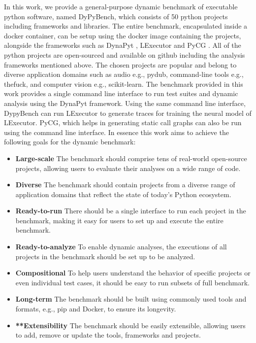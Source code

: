 In this work, we provide a general-purpose dynamic benchmark of executable python software, named DyPyBench, which consists of 50 python projects including frameworks and libraries. The entire benchmark, encapsulated inside a docker container, can be setup using the docker image containing the projects, alongside the frameworks such as DynaPyt \cite{DynaPyt2022}, LExecutor \cite{LExecutor_2023} and PyCG \cite{PyCG_2021}. All of the python projects are open-sourced and available on github \cite{github} including the analysis frameworks mentioned above. The chosen projects are popular and belong to diverse application domains such as audio e.g., pydub, command-line tools e.g., thefuck, and computer vision e.g., scikit-learn. The benchmark provided in this work provides a single command line interface to run test suites and dynamic analysis using the DynaPyt framework. Using the same command line interface, DypyBench can run LExecutor to generate traces for training the neural model of LExecutor. PyCG, which helps in generating static call graphs can also be run using the command line interface. In essence this work aims to achieve the following goals for the dynamic benchmark:
\begin{itemize}
    \item \textbf{Large-scale} The benchmark should comprise tens of real-world open-source projects, allowing users to evaluate their analyses on a wide range of code.
    \item \textbf{Diverse} The benchmark should contain projects from a diverse range of application domains that reflect the state of today's Python ecosystem.
    \item \textbf{Ready-to-run} There should be a single interface to run each project in the benchmark, making it easy for users to set up and execute the entire benchmark.
    \item \textbf{Ready-to-analyze} To enable dynamic analyses, the executions of all projects in the benchmark should be set up to be analyzed.
    \item \textbf{Compositional} To help users understand the behavior of specific projects or even individual test cases, it should be easy to run subsets of full benchmark.
    \item \textbf{Long-term} The benchmark should be built using commonly used tools and formats, e.g., pip and Docker, to ensure its longevity.
    \item \textbf{**Extensibility} The benchmark should be easily extensible, allowing users to add, remove or update the tools, frameworks and projects.  
\end{itemize}

